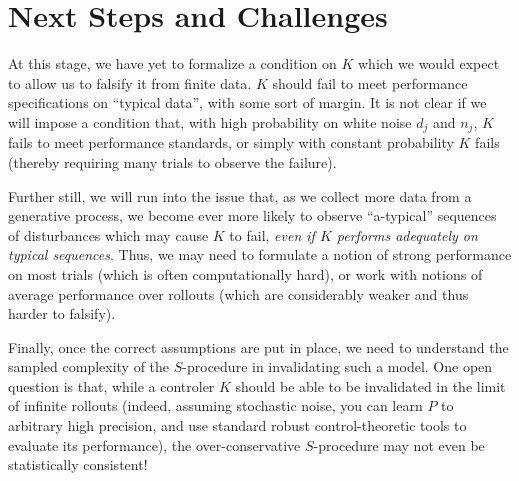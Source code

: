 \documentclass[11pt]{article} %
\theoremstyle{plain}
\theoremstyle{definition}
\theoremstyle{remark}
\begin{document}
\section{Next Steps and Challenges}
At this stage, we have yet to formalize a condition on $K$ which we would expect to allow us to falsify it from finite data. $K$ should fail to meet performance specifications on ``typical data'', with some sort of margin. It is not clear if we will impose a condition that, with high probability on white noise $d_j$ and $n_j$, $K$ fails to meet performance standards, or simply with constant probability $K$ fails (thereby requiring many trials to observe the failure). 

Further still, we will run into the issue that, as we collect more data from a generative process, we become ever more likely to observe ``a-typical'' sequences of disturbances which may cause $K$ to fail, \emph{even if $K$ performs adequately on typical sequences}. Thus, we may need to formulate a notion of strong performance on most trials (which is often computationally hard), or work with notions of average performance over rollouts (which are considerably weaker and thus harder to falsify). 

Finally, once the correct assumptions are put in place, we need to understand the sampled complexity of the $S$-procedure in invalidating such a model. One open question is that, while a controler $K$ should be able to be invalidated in the limit of infinite rollouts (indeed, assuming stochastic noise, you can learn $P$ to arbitrary high precision, and use standard robust control-theoretic tools to evaluate its performance), the over-conservative $S$-procedure may not even be statistically consistent!









\end{document}
